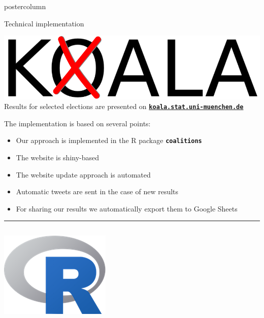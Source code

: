\documentclass[final,hyperref={pdfpagelabels=false}]{beamer}
\newcommand{\bfBlue}[1]{\textcolor{koaladarkestblue}{\textbf{#1}}}
\newcommand*\circled[1]{\tikz[baseline=(char.base)]{
\node[shape=circle,draw,inner sep=2pt] (char) {#1};}}
\begin{document}
\begin{frame}
\begin{columns}
\begin{column}{1\textwidth}
\begin{columns}[T]
\begin{column}{.484\textwidth}
\begin{beamercolorbox}[center,wd=\textwidth]{postercolumn}
\begin{minipage}[T]{.95\textwidth}  %


\begin{block}{\footnotesize \circled{3} Technical implementation}
\begin{center}
\includegraphics[height=5ex]{figures/Koala_Logo_ohneSchrift}
\\[2ex]
Results for selected elections are presented on
\bfBlue{\texttt{\href{http://koala.stat.uni-muenchen.de}{koala.stat.uni-muenchen.de}}}
\end{center}
\vspace{2ex}
The implementation is based on several points:
\begin{itemize}
  \item Our approach is implemented in the R package \bfBlue{\texttt{coalitions}} 
  \item The website is shiny-based
  \item The website update approach is automated
  \item Automatic tweets are sent in the case of new results
  \item For sharing our results we automatically export them to Google Sheets
\end{itemize}

\vspace{1ex}
\textcolor{LMUlightgray}{\hrule{}}
\vspace{1ex}
\begin{columns}[t]
  \begin{column}{.15\textwidth}
  \begin{center}
  \includegraphics[height=5ex]{figures/implementation_r}
  \end{center}
  \end{column}

  \hspace{-1.5ex}
  \textcolor{LMUlightgray}{\vrule{}}
  \hspace{1.5ex}


\end{columns}
\end{block}
\end{minipage}
\end{beamercolorbox}
\end{column}
\end{columns}
\end{column}
\end{columns}
\end{frame}
\end{document}
